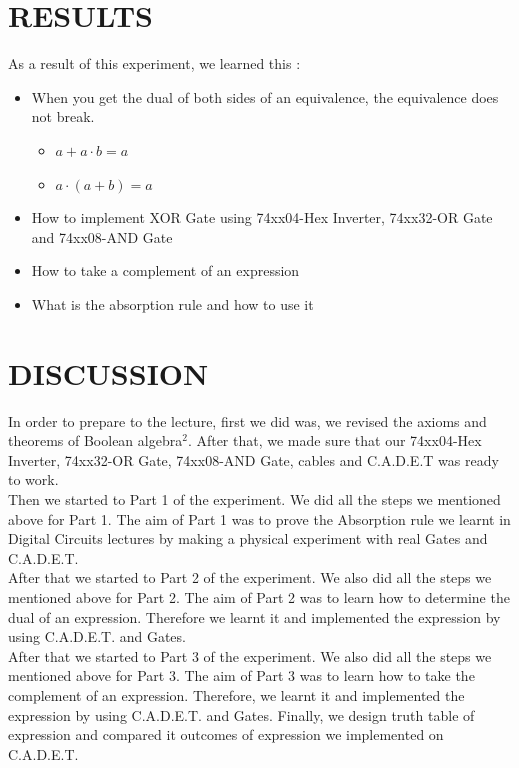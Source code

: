 \documentclass[pdftex,12pt,a4paper]{article}
\begin{document}
\section{RESULTS}

As a result of this experiment, we learned this :
\begin{itemize}
    \item When you get the dual of both sides of an equivalence, the equivalence does not break.
    \begin{itemize}
        \item $a + a \cdot b = a$
        \item $a \cdot (a + b) = a$
    \end{itemize}
    \item How to implement XOR Gate using 74xx04-Hex Inverter, 74xx32-OR Gate and 74xx08-AND Gate
    \item How to take a complement of an expression
    \item What is the absorption rule and how to use it
\end{itemize}



\section{DISCUSSION}
In order to prepare to the lecture, first we did was, we revised the axioms and theorems of Boolean algebra$^{2}$. After that, we made sure that our 74xx04-Hex Inverter, 74xx32-OR Gate, 74xx08-AND Gate, cables and C.A.D.E.T was ready to work.\\

Then we started to Part 1 of the experiment. We did all the steps we mentioned above for Part 1.
The aim of Part 1 was to prove the Absorption rule we learnt in Digital Circuits lectures by making a physical experiment with real Gates and C.A.D.E.T.\\

After that we started to Part 2 of the experiment. We also did all the steps we mentioned above for Part 2. The aim of Part 2 was to learn how to determine the dual of an expression. Therefore we learnt it and implemented the expression by using C.A.D.E.T. and Gates.\\

After that we started to Part 3 of the experiment. We also did all the steps we mentioned above for Part 3. The aim of Part 3 was to learn how to take the complement of an expression. Therefore, we learnt it and implemented the expression by using C.A.D.E.T. and Gates. Finally, we design truth table of expression and compared it outcomes of expression we implemented on C.A.D.E.T.\\
\end{document}
